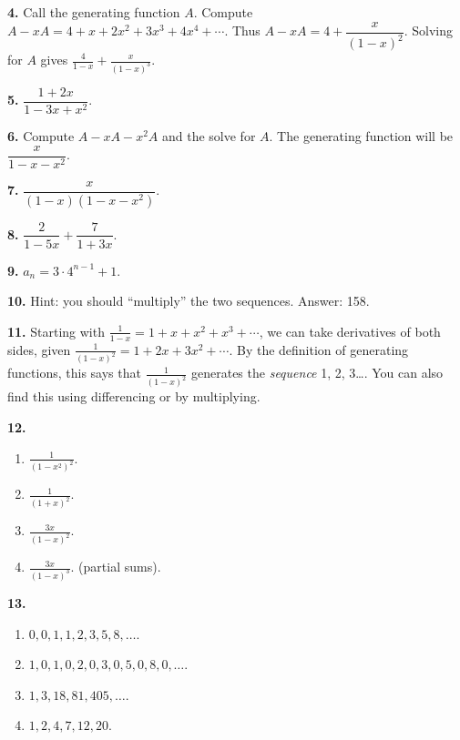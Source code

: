 \documentclass[10pt,]{book}
\theoremstyle{plain}
\theoremstyle{definition}
\theoremstyle{definition}
\theoremstyle{definition}
\numberwithin{equation}{chapter}
\def\d{\displaystyle}
\begin{document}
\par\smallskip
\noindent\textbf{4.}\quad{}
Call the generating function \(A\). Compute \(A - xA = 4 + x + 2x^2 + 3x^3 + 4x^4 + \cdots\). Thus \(A - xA = 4 + \dfrac{x}{(1-x)^2}\). Solving for \(A\) gives \(\d\frac{4}{1-x} + \frac{x}{(1-x)^3}\).
%
\par\smallskip
\noindent\textbf{5.}\quad{}
\(\dfrac{1+2x}{1-3x + x^2}\).
%
\par\smallskip
\noindent\textbf{6.}\quad{}
Compute \(A - xA - x^2A\) and the solve for \(A\). The generating function will be \(\dfrac{x}{1-x-x^2}\).
%
\par\smallskip
\noindent\textbf{7.}\quad{}
\(\dfrac{x}{(1-x)(1-x-x^2)}\).
%
\par\smallskip
\noindent\textbf{8.}\quad{}
\(\dfrac{2}{1-5x} + \dfrac{7}{1+3x}\).
%
\par\smallskip
\noindent\textbf{9.}\quad{}
\(a_n = 3\cdot 4^{n-1} + 1\).
%
\par\smallskip
\noindent\textbf{10.}\quad{}
Hint: you should ``multiply'' the two sequences. Answer: 158.
%
\par\smallskip
\noindent\textbf{11.}\quad{}
Starting with \(\frac{1}{1-x} = 1 + x + x^2 + x^3 +\cdots\), we can take derivatives of both sides, given \(\frac{1}{(1-x)^2} = 1 + 2x + 3x^2 + \cdots\). By the definition of generating functions, this says that \(\frac{1}{(1-x)^2}\) generates the \emph{sequence} 1, 2, 3\dots{}. You can also find this using differencing or by multiplying.
%
\par\smallskip
\noindent\textbf{12.}\quad{}\leavevmode%
\begin{enumerate}[label=(\alph*)]
\item\hypertarget{li-1352}{}\(\frac{1}{(1-x^2)^2}\).%
\item\hypertarget{li-1353}{}\(\frac{1}{(1+x)^2}\).%
\item\hypertarget{li-1354}{}\(\frac{3x}{(1-x)^2}\).%
\item\hypertarget{li-1355}{}\(\frac{3x}{(1-x)^3}\).  (partial sums).%
\end{enumerate}
\par\smallskip
\noindent\textbf{13.}\quad{}\leavevmode%
\begin{enumerate}[label=(\alph*)]
\item\hypertarget{li-1360}{}\(0,0,1,1,2,3,5,8, \ldots\).%
\item\hypertarget{li-1361}{}\(1, 0, 1, 0, 2, 0, 3, 0, 5, 0, 8, 0, \ldots\).%
\item\hypertarget{li-1362}{}\(1, 3, 18, 81, 405, \ldots\).%
\item\hypertarget{li-1363}{}\(1, 2, 4, 7, 12, 20\).%
\end{enumerate}
\end{document}
